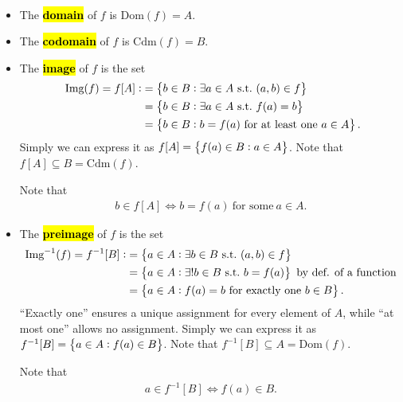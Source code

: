 \documentclass[11pt,openany]{article}
\begin{document}

\newpage
{}
\begin{remark*}
	\ \begin{itemize}
		\item The \hl{\textbf{domain}} of $f$ is $\text{Dom}(f)=A$.
		\item The \hl{\textbf{codomain}} of $f$ is $\text{Cdm}(f)=B$.
		\item The \hl{\textbf{image}} of $f$ is the set \begin{align*}\
			\img{f}=f[A]:&=\set{b\in B:\exists a \in A\ \text{s.t.}\ (a,b)\in f}\\
			&=\set{b\in B:\exists a \in A\ \text{s.t.}\ f(a)=b}\\
			&=\set{b\in B: b = f(a)\ \text{for at least one}\ a\in A}.
		\end{align*} Simply we can express it as $f[A]=\set{f(a)\in B:a\in A}$. Note that $f[A]\subseteq B=\text{Cdm}(f)$. 
	
		Note that \begin{align*}
			b\in f[A]\iff b=f(a)\ \text{for some}\ a\in A.
		\end{align*}
		\item The \hl{\textbf{preimage}} of $f$ is the set \begin{align*}
			\preimg{f}=f^{-1}[B]:&=\set{a\in A:\exists b \in B\ \text{s.t.}\ (a,b)\in f}\\
			&=\set{a\in A:\exists! b \in B\ \text{s.t.}\ b=f(a)}\ \text{by def. of a function}\\
			&=\set{a\in A:f(a)=b\ \text{for exactly one}\ b\in B}.
		\end{align*} ``Exactly one'' ensures a unique assignment for every element of $A$, while ``at most one'' allows no assignment. Simply we can express it as $f^{-1}[B]=\set{a\in A:f(a)\in B}$. Note that $f^{-1}[B]\subseteq A=\text{Dom}(f)$.
	
		Note that \begin{align*}
		a\in f^{-1}[B]\iff f(a)\in B.
\end{align*}
	\end{itemize}
\end{remark*}
\end{document}
